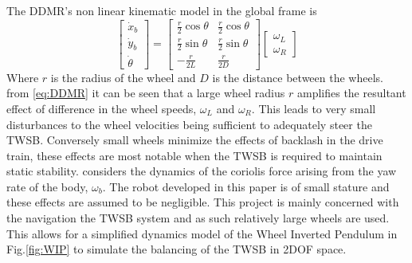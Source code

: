     The  DDMR's non linear kinematic model in the global frame is 
    \begin{equation}
        \begin{bmatrix}
            \dot{x}_b \\
            \dot{y}_b \\
            \dot{\theta}
        \end{bmatrix}
        =
        \begin{bmatrix}
            \frac{r}{2} \cos \theta & \frac{r}{2} \cos \theta \\
            \frac{r}{2} \sin \theta & \frac{r}{2} \sin \theta \\
            -\frac{r}{2L} & \frac{r}{2D}
        \end{bmatrix}
        \begin{bmatrix}
            \omega_L \\
            \omega_R
        \end{bmatrix}
        \label{eq:DDMR}
    \end{equation}
    Where $r$ is the radius of the wheel and $D$ is the distance between the wheels.
    from \ref{eq:DDMR} it can be seen that a large wheel radius $r$ amplifies the resultant effect of difference in the wheel 
    speeds, $\omega_L$ and $\omega_R$. This leads to very small disturbances to the wheel velocities being sufficient 
    to adequately steer the TWSB. Conversely small wheels minimize the effects of backlash in the drive train, these effects are most notable 
    when the TWSB is required to maintain static stability. \cite{kim2015dynamic} considers the dynamics of the coriolis force 
    arising from the yaw rate of the body, $\omega_b$. The robot developed in this paper is of small stature and these effects 
    are assumed to be negligible. This project is mainly concerned with the navigation the TWSB system and as such 
    relatively large wheels are used. This allows for a simplified dynamics model of the Wheel Inverted Pendulum 
    in Fig.\ref{fig:WIP} to simulate the balancing of the TWSB in 2DOF space.

